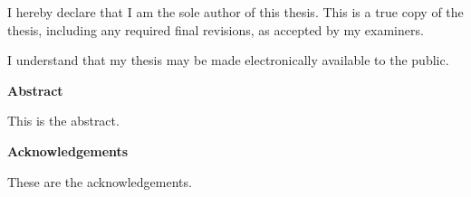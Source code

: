\noindent
I hereby declare that I am the sole author of this thesis. This is a true copy of the thesis, including any required final revisions, as accepted by my examiners.

\bigskip

\noindent
I understand that my thesis may be made electronically available to the public.

\cleardoublepage


\begin{center}\textbf{Abstract}\end{center}

This is the abstract.

\cleardoublepage


\begin{center}\textbf{Acknowledgements}\end{center}

These are the acknowledgements.

\cleardoublepage

\renewcommand\contentsname{Table of Contents}
\tableofcontents
\cleardoublepage
{}    %

\listoftables
\cleardoublepage
{}		%

\listoffigures
\cleardoublepage
{}		%


